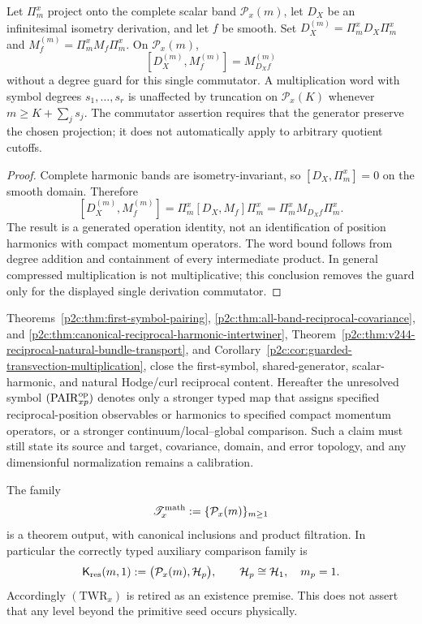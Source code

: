 \documentclass[12pt,a4paper]{article}
\begin{document}
\begin{corollary}
\label{p2c:cor:guarded-transvection-multiplication}
Let $\Pi_m^x$ project onto the complete scalar band $\mathcal P_x(m)$,
let $D_X$ be an infinitesimal isometry derivation, and let $f$ be smooth.
Set $D_X^{(m)}=\Pi_m^xD_X\Pi_m^x$ and
$M_f^{(m)}=\Pi_m^xM_f\Pi_m^x$.
On $\mathcal P_x(m)$,
\[
 [D_X^{(m)},M_f^{(m)}]=M_{D_Xf}^{(m)}
\]
without a degree guard for this single commutator.
A multiplication word with symbol degrees $s_1,\ldots,s_r$ is unaffected by
truncation on $\mathcal P_x(K)$ whenever $m\ge K+\sum_js_j$.
The commutator assertion requires that the generator preserve the chosen
projection; it does not automatically apply to arbitrary quotient cutoffs.
\end{corollary}
\begin{proof}
Complete harmonic bands are isometry-invariant, so
$[D_X,\Pi_m^x]=0$ on the smooth domain. Therefore
\[
 [D_X^{(m)},M_f^{(m)}]
 =\Pi_m^x[D_X,M_f]\Pi_m^x
 =\Pi_m^xM_{D_Xf}\Pi_m^x.
\]
The result is a generated operation identity, not an identification of
position harmonics with compact momentum operators.
The word bound follows from degree addition and containment of every
intermediate product. In general compressed multiplication is not
multiplicative; this conclusion removes the guard only for the displayed
single derivation commutator.
\end{proof}

\begin{remark}
\label{p2c:rem:narrowed-pairxp}
Theorems~\ref{p2c:thm:first-symbol-pairing},
\ref{p2c:thm:all-band-reciprocal-covariance}, and
\ref{p2c:thm:canonical-reciprocal-harmonic-intertwiner},
Theorem~\ref{p2c:thm:v244-reciprocal-natural-bundle-transport}, and
Corollary~\ref{p2c:cor:guarded-transvection-multiplication}, close the
first-symbol, shared-generator, scalar-harmonic, and natural Hodge/curl
reciprocal content.  Hereafter
the unresolved symbol \((\mathrm{PAIR}_{xp}^{\rm op})\) denotes only a stronger typed map that assigns
specified reciprocal-position observables or harmonics to specified compact
momentum operators, or a stronger continuum/local--global comparison.  Such a
claim must still state its source and target, covariance, domain, and error
topology, and any dimensionful normalization remains a calibration.
\end{remark}

\begin{corollary}
\label{p2c:cor:derived-mathematical-position-tower}
The family
\[
 \mathscr T_x^{\rm math}:=\{\mathcal P_x(m)\}_{m\ge1}
\]
is a theorem output, with canonical inclusions and product filtration.  In
particular the correctly typed auxiliary comparison family is
\[
 \mathsf K_{\rm res}(m,1)
 :=\bigl(\mathcal P_x(m),\mathcal H_p\bigr),
 \qquad \mathcal H_p\cong\mathcal H_1,\quad m_p=1.
\]
Accordingly \((\mathrm{TWR}_x)\) is retired as an existence premise.  This
does not assert that any level beyond the primitive seed occurs physically.
\end{corollary}
\end{document}
